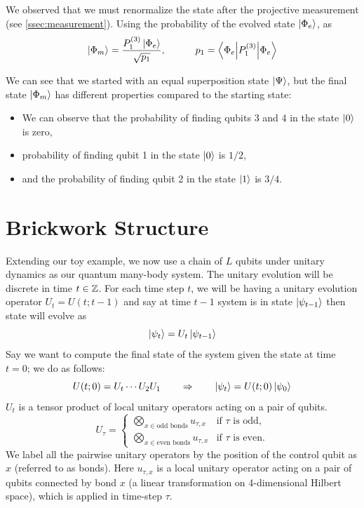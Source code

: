 \documentclass[11pt, oneside, listof=totoc]{scrbook}
\renewcommand{\d}{1}
\newcommand{\ku}{\ket{0}}
\newcommand{\kd}{\ket{1}}
\begin{document}
We observed that we must renormalize the state after the projective measurement (see \cref{ssec:measurement}). Using the probability of the evolved state \(\ket{\Phi_e}\), as
\begin{equation*}
    \ket{\Phi_m} = \frac{P_{\d}^{(3)} \ket{\Phi_e}}{\sqrt{p_1}}, \qquad \quad p_1 = \ev**{P_{\d}^{(3)}}{\Phi_e}
\end{equation*}

We can see that we started with an equal superposition state \(\ket{\Psi}\), but the final state \(\ket{\Phi_m}\) has different properties compared to the starting state:
\begin{itemize}
    \item We can observe that the probability of finding qubits 3 and 4 in the state \(\ku\) is zero,
    \item probability of finding qubit 1 in the state \(\ku\) is \(1/2\),
    \item and the probability of finding qubit 2 in the state \(\kd\) is \(3/4\).
\end{itemize}


\section{Brickwork Structure}\label{sec:brickwork}

Extending our toy example, we now use a chain of \(L\) qubits under unitary dynamics as our quantum many-body system. The unitary evolution will be discrete in time \(t \in \mathbb Z\). For each time step \(t\), we will be having a unitary evolution operator \(U_t = U(t; t-1)\) and say at time \(t-1\) system is in state \(\ket{\psi_{t-1}}\) then state will evolve as
\begin{equation}
    \ket{\psi_t} = U_t \ket{\psi_{t-1}}
\end{equation}
Say we want to compute the final state of the system given the state at time \(t = 0\); we do as follows:
\begin{equation}
    U(t; 0) = U_t \cdots U_2 U_1 \qquad \Rightarrow \qquad \ket{\psi_t} = U(t; 0) \ket{\psi_0}
\end{equation}
\(U_t\) is a tensor product of local unitary operators acting on a pair of qubits.
\begin{equation}
    U_{\tau} = \begin{cases}
        \bigotimes\limits_{x \in \text{odd bonds}} u_{\tau, x}  & \text{if $\tau$ is odd},  \\[3ex]
        \bigotimes\limits_{x \in \text{even bonds}} u_{\tau, x} & \text{if $\tau$ is even}.
    \end{cases}
\end{equation}
We label all the pairwise unitary operators by the position of the control qubit as \(x\) (referred to as bonds). Here \(u_{\tau, x}\) is a local unitary operator acting on a pair of qubits connected by bond \(x\) (\ie a linear transformation on 4-dimensional Hilbert space), which is applied in time-step \(\tau\).
\end{document}
